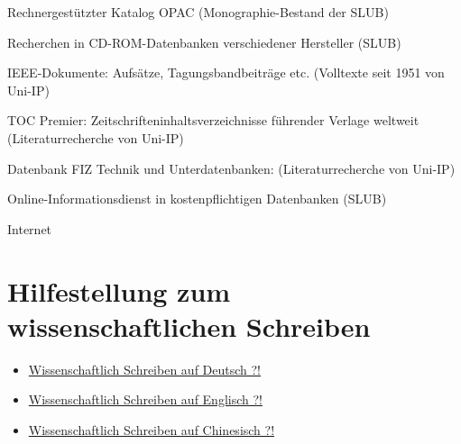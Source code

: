 \begin{compactitem}
  \item Rechnergestützter Katalog OPAC (Monographie-Bestand der SLUB)
  \item Recherchen in CD-ROM-Datenbanken verschiedener Hersteller (SLUB)
  \item IEEE-Dokumente: Aufsätze, Tagungsbandbeiträge etc. (Volltexte seit 1951 von Uni-IP)
  \item TOC Premier: Zeitschrifteninhaltsverzeichnisse führender Verlage weltweit (Literaturrecherche von Uni-IP)
  \item Datenbank FIZ Technik und Unterdatenbanken: (Literaturrecherche von Uni-IP)
  \item Online-Informationsdienst in kostenpflichtigen Datenbanken (SLUB)
  \item Internet
\end{compactitem}

\section{Hilfestellung zum wissenschaftlichen Schreiben}
\label{sec:HilfestellungZumwissenschaftlichenSchreiben}

\begin{itemize}
  \item \href{http://www.et.tu-dresden.de/ifa/fileadmin/user_upload/www_files/richtlinien_sa_da/Flyer_Wiss_Schreiben_Deutsch.pdf}{Wissenschaftlich Schreiben auf Deutsch ?!}
  \item \href{http://www.et.tu-dresden.de/ifa/fileadmin/user_upload/www_files/richtlinien_sa_da/Flyer_Wiss_Schreiben_Englisch.pdf}{Wissenschaftlich Schreiben auf Englisch ?!}
  \item \href{http://www.et.tu-dresden.de/ifa/fileadmin/user_upload/www_files/richtlinien_sa_da/Flyer_Wiss_Schreiben_Chinesisch.pdf}{Wissenschaftlich Schreiben auf Chinesisch ?!}
\end{itemize}